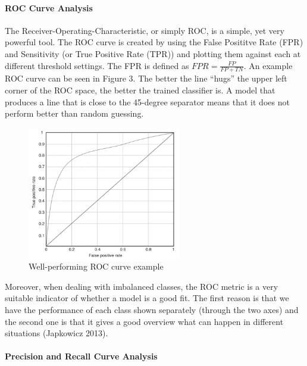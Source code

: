 \documentclass[12pt,]{article}
\let\oldparagraph\paragraph
\renewcommand{\paragraph}[1]{\oldparagraph{#1}\mbox{}}
\begin{document}
\hypertarget{roc-curve-analysis}{%
\paragraph{ROC Curve Analysis}\label{roc-curve-analysis}}

The Receiver-Operating-Characteristic, or simply ROC, is a simple, yet
very powerful tool. The ROC curve is created by using the False
Posititve Rate (FPR) and Sensitivity (or True Positive Rate (TPR)) and
plotting them against each at different threshold settings. The FPR is
defined as \(FPR=\frac{FP}{FP+TN}\). An example ROC curve can be seen in
Figure 3. The better the line ``hugs'' the upper left corner of the ROC
space, the better the trained classifier is. A model that produces a
line that is close to the 45-degree separator means that it does not
perform better than random guessing.

\begin{figure}
\centering
\includegraphics[width=0.6\textwidth,height=\textheight]{figures/roc_curve_example.png}
\caption{Well-performing ROC curve example}
\end{figure}

Moreover, when dealing with imbalanced classes, the ROC metric is a very
suitable indicator of whether a model is a good fit. The first reason is
that we have the performance of each class shown separately (through the
two axes) and the second one is that it gives a good overview what can
happen in different situations (Japkowicz 2013).

\hypertarget{precision-and-recall-curve-analysis}{%
\paragraph{Precision and Recall Curve
Analysis}\label{precision-and-recall-curve-analysis}}
\end{document}

